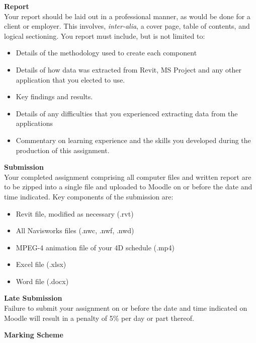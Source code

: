 \newpage
\textbf{Report}\\
Your report should be laid out in a professional manner, as would be done for a client or employer.  This involves, \emph{inter-alia}, a cover page, table of contents, and logical sectioning.  You report must include, but is not limited to:
\begin{itemize}
	\item Details of the methodology used to create each component
	\item Details of how data was extracted from Revit, MS Project and any other application that you elected to use.
	\item Key findings and results.
	\item Details of any difficulties that you experienced extracting data from the applications
	\item Commentary on learning experience and the skills you developed during the production of this assignment.
\end{itemize}
  
\vspace{1cm}





\textbf{Submission}\\
Your completed assignment comprising all computer files and written report are to be zipped into a single file and uploaded to Moodle on or before the date and time indicated.  Key components of the submission are:
\begin{itemize}
	\item Revit file, modified as necessary (.rvt)
	\item All Navisworks files (.nwc, .nwf, .nwd)
	\item MPEG-4 animation file of your 4D schedule (.mp4) 
	\item Excel file (.xlsx)
	\item Word file (.docx)
\end{itemize}




\textbf{Late Submission}\\
Failure to submit your assignment on or before the date and time indicated on Moodle will result in a penalty of 5\% per day or part thereof.

\vspace{0.5cm}
\textbf{Marking Scheme}

